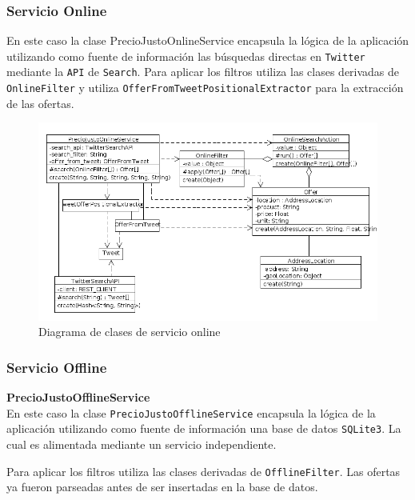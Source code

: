 \subsubsection{Servicio Online}
En este caso la clase PrecioJustoOnlineService encapsula la l\'ogica de la aplicaci\'on utilizando como fuente de informaci\'on las b\'usquedas directas en \texttt{Twitter} mediante la \texttt{API} de \texttt{Search}.
Para aplicar los filtros utiliza las clases derivadas de \texttt{OnlineFilter} y utiliza \texttt{OfferFromTweetPositionalExtractor} para la extracci\'on de las ofertas.

\begin{figure}[h]
\centerline{\includegraphics[width=0.6\paperwidth]{./imgs/class_diagram_online_service.png}}
\caption{Diagrama de clases de servicio online}
\label{fig:class_online_service}
\end{figure}

\subsubsection{Servicio Offline}

\textbf{PrecioJustoOfflineService}\\

En este caso la clase \texttt{PrecioJustoOfflineService} encapsula la l\'ogica de la aplicaci\'on utilizando como fuente de informaci\'on una base de datos \texttt{SQLite3}. La cual es alimentada mediante un servicio independiente.

Para aplicar los filtros utiliza las clases derivadas de \texttt{OfflineFilter}. Las ofertas
ya fueron parseadas antes de ser insertadas en la base de datos.

